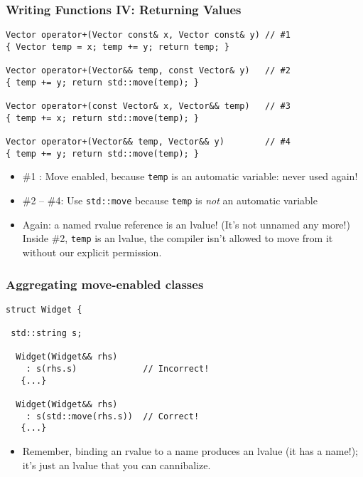
\begin{frame}[fragile]
\frametitle{Writing Functions IV: Returning Values}
{\scriptsize
\begin{verbatim}
Vector operator+(Vector const& x, Vector const& y) // #1
{ Vector temp = x; temp += y; return temp; }
 
Vector operator+(Vector&& temp, const Vector& y)   // #2
{ temp += y; return std::move(temp); }
 
Vector operator+(const Vector& x, Vector&& temp)   // #3
{ temp += x; return std::move(temp); }
 
Vector operator+(Vector&& temp, Vector&& y)        // #4
{ temp += y; return std::move(temp); }
\end{verbatim}
}
\begin{itemize}
\item \#1 : Move enabled, because \texttt{temp} is an automatic
  variable:  never used again!
\item \#2 -- \#4: Use \texttt{std::move} because \texttt{temp} is \emph{not}
  an automatic variable

\item Again: a named rvalue reference is an lvalue! (It's not unnamed any
  more!) Inside \#2, \texttt{temp} is an lvalue, the compiler isn't
  allowed to move from it without our explicit permission.
\end{itemize}


\end{frame}




\begin{frame}[fragile]
\frametitle{Aggregating move-enabled classes}
{\scriptsize
\begin{verbatim}
struct Widget {  

 std::string s;

  Widget(Widget&& rhs)
    : s(rhs.s)             // Incorrect!
   {...}

  Widget(Widget&& rhs)
    : s(std::move(rhs.s))  // Correct!
   {...}
\end{verbatim}
}
\begin{itemize}
\item Remember, binding an rvalue to a name produces an lvalue (it
  has a name!); it's just an lvalue that you can cannibalize.
\end{itemize}


\end{frame}

